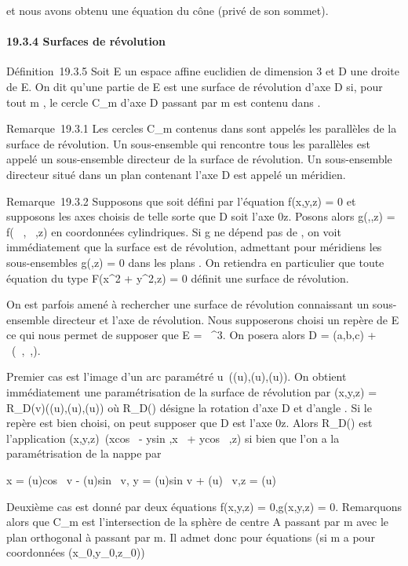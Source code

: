 \documentclass[]{article}
\begin{document}
et nous avons obtenu une équation du cône (privé de son sommet).

\paragraph{19.3.4 Surfaces de révolution}

Définition~19.3.5 Soit E un espace affine euclidien de dimension 3 et D
une droite de E. On dit qu'une partie \Sigma de E est une surface de
révolution d'axe D si, pour tout m \in \Sigma, le cercle C_m d'axe D
passant par m est contenu dans \Sigma.

Remarque~19.3.1 Les cercles C_m contenus dans \Sigma sont appelés
les parallèles de la surface de révolution. Un sous-ensemble qui
rencontre tous les parallèles est appelé un sous-ensemble directeur de
la surface de révolution. Un sous-ensemble directeur situé dans un plan
contenant l'axe D est appelé un méridien.

Remarque~19.3.2 Supposons que \Sigma soit défini par l'équation f(x,y,z) = 0
et supposons les axes choisis de telle sorte que D soit l'axe 0z. Posons
alors g(\rho,\theta,z) = f(\rhocos~
\theta,\rhosin~ \theta,z) en coordonnées cylindriques. Si g
ne dépend pas de \theta, on voit immédiatement que la surface est de
révolution, admettant pour méridiens les sous-ensembles g(\rho,z) = 0 dans
les plans \rhoOz. On retiendra en particulier que toute équation du type
F(x^2 + y^2,z) = 0 définit une surface de
révolution.

On est parfois amené à rechercher une surface de révolution connaissant
un sous-ensemble directeur \Gamma et l'axe de révolution. Nous supposerons
choisi un repère de E ce qui nous permet de supposer que E =
~^3. On posera alors D = (a,b,c) + ~(\alpha~,\beta~,\gamma).

Premier cas \Gamma est l'image d'un arc paramétré
u\mapsto~(\phi(u),\psi(u),\omega(u)). On obtient immédiatement
une paramétrisation de la surface de révolution par (x,y,z) =
R_D(v)(\phi(u),\psi(u),\omega(u)) où R_D(\theta) désigne la rotation
d'axe D et d'angle \theta. Si le repère est bien choisi, on peut supposer que
D est l'axe 0z. Alors R_D(\theta) est l'application
(x,y,z)\mapsto~(xcos~ \theta -
ysin \theta,x\sin~ \theta +
ycos~ \theta,z) si bien que l'on a la
paramétrisation de la nappe par

x = \phi(u)cos~ v -
\psi(u)sin~ v, y =
\phi(u)sin v + \psi(u)\cos~
v,z = \omega(u)

Deuxième cas \Gamma est donné par deux équations f(x,y,z) = 0,g(x,y,z) = 0.
Remarquons alors que C_m est l'intersection de la sphère de
centre A passant par m avec le plan orthogonal à
\vecu passant par m. Il admet donc pour équations (si
m a pour coordonnées (x_0,y_0,z_0))
\end{document}
